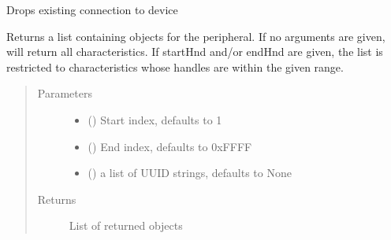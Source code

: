 \documentclass[letterpaper,10pt,english]{sphinxmanual}
\begin{document}
\begin{fulllineitems}

\begin{fulllineitems}
\label{\detokenize{simpleble:simpleble.SimpleBleDevice.disconnect}}
Drops existing connection to device

\end{fulllineitems}


\begin{fulllineitems}
\label{\detokenize{simpleble:simpleble.SimpleBleDevice.getCharacteristics}}
Returns a list containing  objects for the peripheral. If no arguments are given, will return all characteristics. If startHnd and/or endHnd are given, the list is restricted to characteristics whose handles are within the given range.
\begin{quote}\begin{description}
\item[{Parameters}] \leavevmode\begin{itemize}
\item {} 
 (\sphinxstyleliteralemphasis{\sphinxupquote{, }}) \textendash{} Start index, defaults to 1

\item {} 
 (\sphinxstyleliteralemphasis{\sphinxupquote{, }}) \textendash{} End index, defaults to 0xFFFF

\item {} 
 (\sphinxstyleliteralemphasis{\sphinxupquote{, }}) \textendash{} a list of UUID strings, defaults to None

\end{itemize}

\item[{Returns}] \leavevmode
List of returned  objects


\end{description}
\end{quote}
\end{fulllineitems}
\end{fulllineitems}
\end{document}
